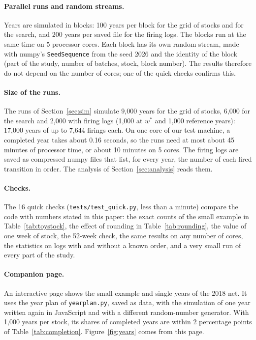 \documentclass[11pt]{article}
\begin{document}
\paragraph{Parallel runs and random streams.} Years are simulated in blocks: 100 years per block for the grid of stocks and for the search, and 200 years per saved file for the firing logs. The blocks run at the same time on 5 processor cores. Each block has its own random stream, made with numpy's \texttt{SeedSequence} from the seed 2026 and the identity of the block (part of the study, number of batches, stock, block number). The results therefore do not depend on the number of cores; one of the quick checks confirms this.

\paragraph{Size of the runs.} The runs of Section~\ref{sec:sim} simulate 9{,}000 years for the grid of stocks, 6{,}000 for the search and 2{,}000 with firing logs (1{,}000 at $w^*$ and 1{,}000 reference years): 17{,}000 years of up to 7{,}644 firings each. On one core of our test machine, a completed year takes about 0.16 seconds, so the runs need at most about 45 minutes of processor time, or about 10 minutes on 5 cores. The firing logs are saved as compressed numpy files that list, for every year, the number of each fired transition in order. The analysis of Section~\ref{sec:analysis} reads them.

\paragraph{Checks.} The 16 quick checks (\texttt{tests/test\_quick.py}, less than a minute) compare the code with numbers stated in this paper: the exact counts of the small example in Table~\ref{tab:toystock}, the effect of rounding in Table~\ref{tab:rounding}, the value of one week of stock, the 52-week check, the same results on any number of cores, the statistics on logs with and without a known order, and a very small run of every part of the study.

\paragraph{Companion page.} An interactive page shows the small example and single years of the 2018 net. It uses the year plan of \texttt{yearplan.py}, saved as data, with the simulation of one year written again in JavaScript and with a different random-number generator. With 1{,}000 years per stock, its shares of completed years are within 2 percentage points of Table~\ref{tab:completion}. Figure~\ref{fig:years} comes from this page.
\end{document}
